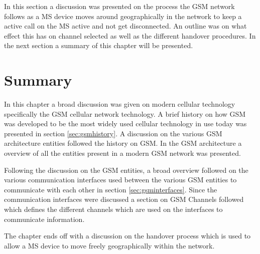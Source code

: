 In this section a discussion was presented on the process the GSM network follows as a MS device moves around geographically in the network to keep a active call on the MS active and not get disconnected. An outline was on what effect this has on channel selected as well as the different handover procedures. In the next section a summary of this chapter will be presented. 
\section{Summary}
In this chapter a broad discussion was given on modern cellular technology specifically the GSM cellular network technology. A brief history on how GSM was developed to be the most widely used cellular technology in use today was presented in section \ref{sec:gsmhistory}. A discussion on the various GSM architecture entities followed the history on GSM. In the GSM architecture a overview of all the entities present in a modern GSM network was presented.

Following the discussion on the GSM entities, a broad overview followed on the various communication interfaces used between the various GSM entities to communicate with each other in section \ref{sec:gsminterfaces}. Since the communication interfaces were discussed a section on GSM Channels followed which defines the different channels which are used on the interfaces to communicate information.

The chapter ends off with a discussion on the handover process which is used to allow a MS device to move freely geographically within the network. 
